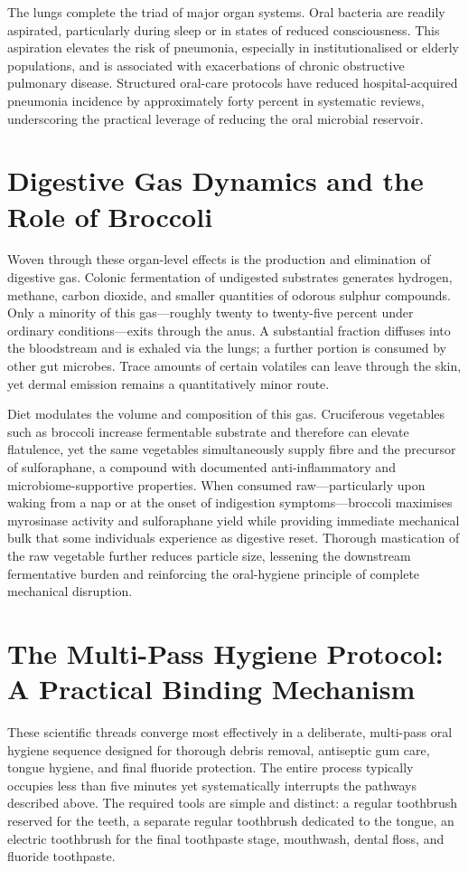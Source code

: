\documentclass[11pt,a4paper]{article}
\begin{document}
The lungs complete the triad of major organ systems. Oral bacteria are readily aspirated, particularly during sleep or in states of reduced consciousness. This aspiration elevates the risk of pneumonia, especially in institutionalised or elderly populations, and is associated with exacerbations of chronic obstructive pulmonary disease. Structured oral-care protocols have reduced hospital-acquired pneumonia incidence by approximately forty percent in systematic reviews, underscoring the practical leverage of reducing the oral microbial reservoir.

\section{Digestive Gas Dynamics and the Role of Broccoli}
Woven through these organ-level effects is the production and elimination of digestive gas. Colonic fermentation of undigested substrates generates hydrogen, methane, carbon dioxide, and smaller quantities of odorous sulphur compounds. Only a minority of this gas---roughly twenty to twenty-five percent under ordinary conditions---exits through the anus. A substantial fraction diffuses into the bloodstream and is exhaled via the lungs; a further portion is consumed by other gut microbes. Trace amounts of certain volatiles can leave through the skin, yet dermal emission remains a quantitatively minor route.

Diet modulates the volume and composition of this gas. Cruciferous vegetables such as broccoli increase fermentable substrate and therefore can elevate flatulence, yet the same vegetables simultaneously supply fibre and the precursor of sulforaphane, a compound with documented anti-inflammatory and microbiome-supportive properties. When consumed raw---particularly upon waking from a nap or at the onset of indigestion symptoms---broccoli maximises myrosinase activity and sulforaphane yield while providing immediate mechanical bulk that some individuals experience as digestive reset. Thorough mastication of the raw vegetable further reduces particle size, lessening the downstream fermentative burden and reinforcing the oral-hygiene principle of complete mechanical disruption.

\section{The Multi-Pass Hygiene Protocol: A Practical Binding Mechanism}
These scientific threads converge most effectively in a deliberate, multi-pass oral hygiene sequence designed for thorough debris removal, antiseptic gum care, tongue hygiene, and final fluoride protection. The entire process typically occupies less than five minutes yet systematically interrupts the pathways described above. The required tools are simple and distinct: a regular toothbrush reserved for the teeth, a separate regular toothbrush dedicated to the tongue, an electric toothbrush for the final toothpaste stage, mouthwash, dental floss, and fluoride toothpaste.
\end{document}
